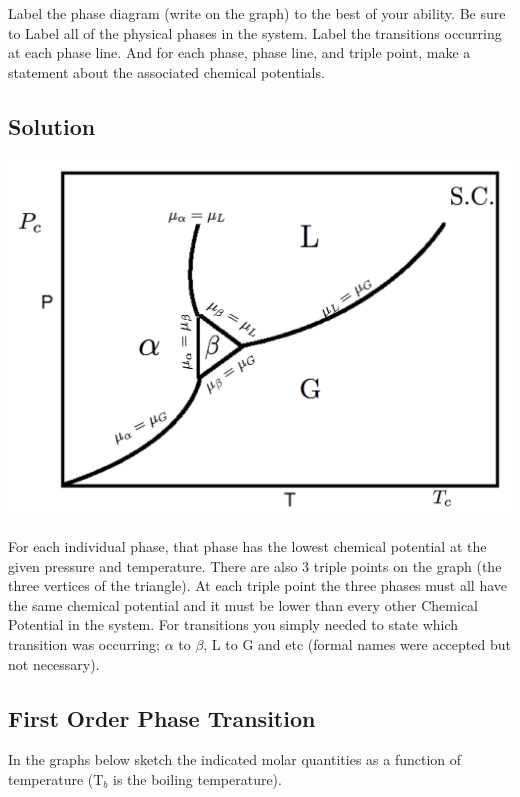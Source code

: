 \documentclass{article}
\begin{document}
Label the phase diagram (write on the graph) to the best of your ability. 
Be sure to Label all of the physical phases in the system.
Label the transitions occurring at each phase line.
And for each phase, phase line, and triple point, make a statement about the associated chemical potentials. 

\subsection*{Solution}
\includegraphics{ps6_soln.png}

For each individual phase, that phase has the lowest chemical potential at the given pressure and temperature. 
There are also 3 triple points on the graph (the three vertices of the triangle). 
At each triple point the three phases must all have the same chemical potential and it must be lower than every other Chemical Potential in the system. 
For transitions you simply needed to state which transition was occurring; $\alpha$ to $\beta$, L to G and etc (formal names were accepted but not necessary). 

\newpage 

\subsection*{First Order Phase Transition}
In the graphs below sketch the indicated molar quantities as a function of temperature (T$_b$ is the boiling temperature). 
\end{document}
